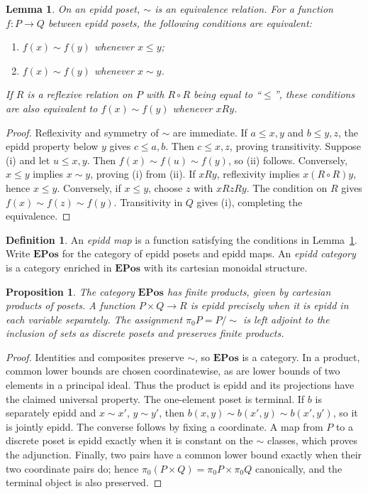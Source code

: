 \documentclass[11pt,reqno,a4paper]{amsart}
\newtheorem{lemma}[theorem]{Lemma}
\newtheorem{proposition}[theorem]{Proposition}
\theoremstyle{definition}
\newtheorem{definition}[theorem]{Definition}
\theoremstyle{remark}
\newcommand{\0}{\mathbf{0}}
\renewcommand{\1}{\mathbf{1}}
\newcommand{\EPos}{\mathbf{EPos}}
\begin{document}
\begin{lemma}\label{lem:epidd}
On an epidd poset, $\sim$ is an equivalence relation. For a function
$f:P\to Q$ between epidd posets, the following conditions are equivalent:
\begin{enumerate}[label=\textup{(\roman*)}]
\item $f(x)\sim f(y)$ whenever $x\leqslant y$;
\item $f(x)\sim f(y)$ whenever $x\sim y$.
\end{enumerate}
If $R$ is a reflexive relation on $P$ with $R\circ R$ being equal to ``$\leqslant$'', these
conditions are also equivalent to $f(x)\sim f(y)$ whenever $xRy$.
\end{lemma}
\begin{proof}
Reflexivity and symmetry of $\sim$ are immediate. If $a\leqslant x,y$
and $b\leqslant y,z$, the epidd property below $y$ gives $c\leqslant a,b$.
Then $c\leqslant x,z$, proving transitivity.
Suppose (i) and let $u\leqslant x,y$. Then
$f(x)\sim f(u)\sim f(y)$, so (ii) follows. Conversely, $x\leqslant y$
implies $x\sim y$, proving (i) from (ii).
If $xRy$, reflexivity implies $x(R\circ R)y$, hence $x\leqslant y$.
Conversely, if $x\leqslant y$, choose $z$ with $xRzRy$. The condition
on $R$ gives $f(x)\sim f(z)\sim f(y)$. Transitivity in $Q$ gives
(i), completing the equivalence.
\end{proof}

\begin{definition}
An \emph{epidd map} is a function satisfying the conditions in Lemma~\ref{lem:epidd}.
Write $\EPos$ for the category of epidd posets and epidd maps.
An \emph{epidd category} is a category enriched in $\EPos$ with its
cartesian monoidal structure.
\end{definition}

\begin{proposition}\label{prop:epidd-products}
The category $\EPos$ has finite products, given by cartesian products
of posets. A function $P\times Q\to R$ is epidd precisely when it is
epidd in each variable separately. The assignment
$\pi_0P=P/{\sim}$ is left adjoint to the inclusion of sets as discrete
posets and preserves finite products.
\end{proposition}
\begin{proof}
Identities and composites preserve $\sim$, so $\EPos$ is a category.
In a product, common lower bounds are chosen coordinatewise, as are
lower bounds of two elements in a principal ideal. Thus the product
is epidd and its projections have the claimed universal property.
The one-element poset is terminal. If $b$ is separately epidd and
$x\sim x'$, $y\sim y'$, then
$b(x,y)\sim b(x',y)\sim b(x',y')$, so it is jointly epidd.
The converse follows by fixing a coordinate. A map from $P$ to a
discrete poset is epidd exactly when it is constant on the $\sim$
classes, which proves the adjunction. Finally, two pairs have a common
lower bound exactly when their two coordinate pairs do; hence
$\pi_0(P\times Q)=\pi_0P\times\pi_0Q$ canonically, and the terminal
object is also preserved.
\end{proof}
\end{document}
